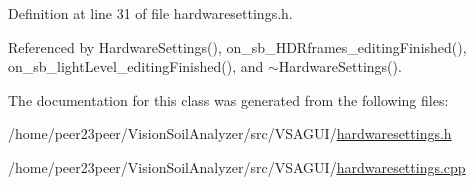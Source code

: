 Definition at line 31 of file hardwaresettings.\+h.



Referenced by Hardware\+Settings(), on\+\_\+sb\+\_\+\+H\+D\+Rframes\+\_\+editing\+Finished(), on\+\_\+sb\+\_\+light\+Level\+\_\+editing\+Finished(), and $\sim$\+Hardware\+Settings().



The documentation for this class was generated from the following files\+:\begin{DoxyCompactItemize}
\item 
/home/peer23peer/\+Vision\+Soil\+Analyzer/src/\+V\+S\+A\+G\+U\+I/\hyperlink{hardwaresettings_8h}{hardwaresettings.\+h}\item 
/home/peer23peer/\+Vision\+Soil\+Analyzer/src/\+V\+S\+A\+G\+U\+I/\hyperlink{hardwaresettings_8cpp}{hardwaresettings.\+cpp}\end{DoxyCompactItemize}
